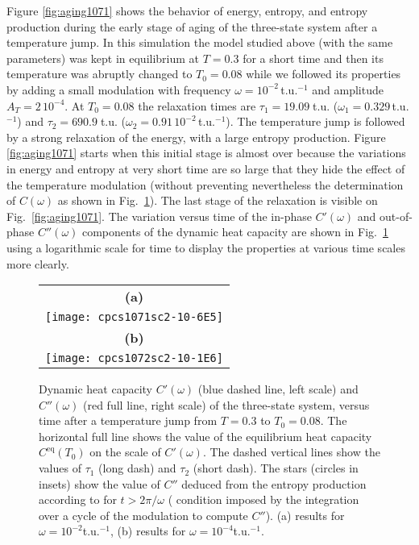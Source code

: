 \documentclass[pre,a4paper,twocolumn,superscriptaddress,%
floatfix]{revtex4}
\newcommand{\dtac}{\ensuremath{A_T}}
\begin{document}
Figure \ref{fig:aging1071} shows the behavior of energy, entropy, and entropy
production during the early stage of aging of the three-state system after a
temperature jump. In this simulation the model studied above (with the same
parameters) was kept in equilibrium at $T = 0.3$ for a short time and then its
temperature was abruptly changed to $T_0 = 0.08$ while we followed its
properties by adding a small modulation with frequency $\omega =
10^{-2}\,$t.u.$^{-1}$ and
amplitude $\dtac = 2\,10^{-4}$. At $T_0 = 0.08$ the relaxation times are
$\tau_1 = 19.09\;$t.u. ($\omega_1 = 0.329\,$t.u.$^{-1}$) and $\tau_2 =
690.9\;$t.u. ($\omega_2 = 0.91\,10^{-2}\,$t.u.$^{-1}$).
The temperature jump is followed by
a strong relaxation of the energy, with a large entropy production. Figure
\ref{fig:aging1071} starts when this initial stage is almost over because the
variations in energy and entropy at very short time are so large that they
hide the effect of the temperature modulation (without preventing nevertheless
the determination of $C(\omega)$ as shown in Fig.~\ref{fig:comegaging}).
The last stage of the relaxation is visible on
Fig.~\ref{fig:aging1071}. The variation versus time of the in-phase
$C'(\omega)$ and out-of-phase $C''(\omega)$ components of the dynamic heat
capacity are shown in Fig.~\ref{fig:comegaging} using a logarithmic scale for
time to display the properties at various time scales more clearly.

\begin{figure}[h]
  \centering
  \begin{tabular}{c}
    \textbf{(a)} \\
    \texttt{[image: cpcs1071sc2-10-6E5]} \\
     \textbf{(b)} \\
    \texttt{[image: cpcs1072sc2-10-1E6]}
  \end{tabular}
  \caption{Dynamic heat capacity $C'(\omega)$ (blue dashed line,
    left scale) and
    $C''(\omega)$ (red full line, right scale) of the three-state
    system, versus time after a temperature jump from $T=0.3$ to
  $T_0 = 0.08$. The horizontal full line shows the value of the equilibrium
  heat capacity $C^{\mathrm{eq}}(T_0)$ on the scale of $C'(\omega)$. The dashed
  vertical lines show the values of $\tau_1$ (long dash)  and $\tau_2$ (short
  dash). The stars (circles
  in insets)
  show the value of $C''$ deduced from the entropy production
  according to \cite{GARDEN-RICHARD} for $t > 2 \pi / \omega$ (
  condition imposed by the
  integration over a cycle of the modulation to compute
  $C''$). (a) results for $\omega = 10^{-2}$t.u.$^{-1}$,
(b) results for $\omega = 10^{-4}$t.u.$^{-1}$.}
  \label{fig:comegaging}
\end{figure}
\end{document}
